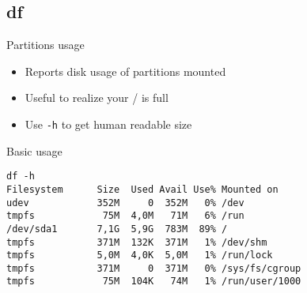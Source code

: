 \subsection{df}

\begin{frame}[fragile]{Partitions usage}
  \begin{itemize}
    \pause \item Reports disk usage of partitions mounted
    \pause \item Useful to realize your / is full
    \pause \item Use \texttt{-h} to get human readable size
  \end{itemize}
  \pause
  \begin{exampleblock}{Basic usage}
    \begin{lstlisting}[showstringspaces=false,basicstyle=\tiny]
df -h
Filesystem      Size  Used Avail Use% Mounted on
udev            352M     0  352M   0% /dev
tmpfs            75M  4,0M   71M   6% /run
/dev/sda1       7,1G  5,9G  783M  89% /
tmpfs           371M  132K  371M   1% /dev/shm
tmpfs           5,0M  4,0K  5,0M   1% /run/lock
tmpfs           371M     0  371M   0% /sys/fs/cgroup
tmpfs            75M  104K   74M   1% /run/user/1000
    \end{lstlisting}
  \end{exampleblock}
\end{frame}
